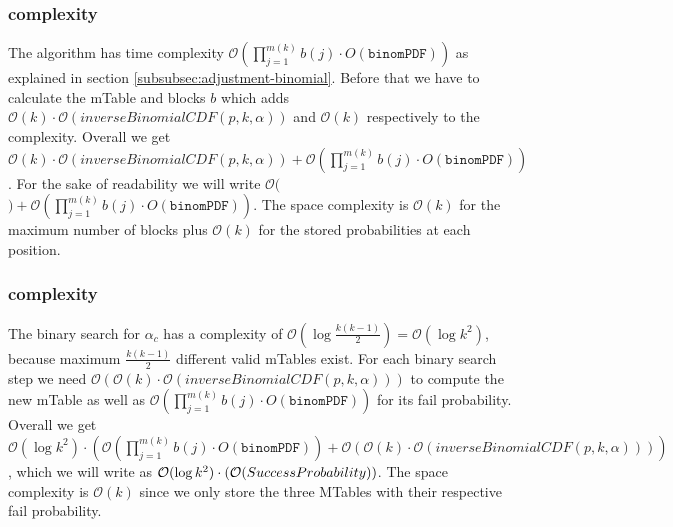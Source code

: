 \subsubsection{\algoRecursive complexity}\label{subsubsec:success-prob-complexity}
The algorithm \algoRecursive has time complexity $\mathcal{O}(\prod_{j=1}^{m(k)}b(j) \cdot O(\texttt{binomPDF}))$ as explained in section \ref{subsubsec:adjustment-binomial}.
%
Before that we have to calculate the mTable and blocks $b$ which adds $\mathcal{O}(k) \cdot \mathcal{O}(inverseBinomialCDF(p,k,\alpha))$ and $\mathcal{O}(k)$ respectively to the complexity.
%
Overall we get $\mathcal{O}(k) \cdot \mathcal{O}(inverseBinomialCDF(p,k,\alpha)) + \mathcal{O}(\prod_{j=1}^{m(k)}b(j) \cdot O(\texttt{binomPDF}))$.
%
For the sake of readability we will write $\mathcal{O}($\algoMtable$) + \mathcal{O}(\prod_{j=1}^{m(k)}b(j) \cdot O(\texttt{binomPDF}))$.
%
The space complexity is $\mathcal{O}(k)$ for the maximum number of blocks plus $\mathcal{O}(k)$ for the stored probabilities at each position.
%
\subsubsection{\algoBinomBinary complexity}\label{subsubsec:binom-binary-complexity}
The binary search for $\alpha_c$ has a complexity of $\mathcal{O}(\log{}\frac{k(k-1)}{2}) = \mathcal{O}(\log{}k^2)$, because maximum $\frac{k(k-1)}{2}$ different valid mTables exist.
%
For each binary search step we need $\mathcal{O}(\mathcal{O}(k) \cdot \mathcal{O}(inverseBinomialCDF(p,k,\alpha)))$ to compute the new mTable as well as $\mathcal{O}(\prod_{j=1}^{m(k)}b(j) \cdot O(\texttt{binomPDF}))$ for its fail probability.
%
Overall we get $\mathcal{O}(\log{}k^2) \cdot (\mathcal{O}(\prod_{j=1}^{m(k)}b(j) \cdot O(\texttt{binomPDF})) + \mathcal{O}(\mathcal{O}(k) \cdot \mathcal{O}(inverseBinomialCDF(p,k,\alpha))))$, which we will write as $\mathcal{O}(\log{}k^2) \cdot (\mathcal{O}({\sc SuccessProbability}))$.
%
The space complexity is $\mathcal{O}(k)$ since we only store the three MTables with their respective fail probability.
